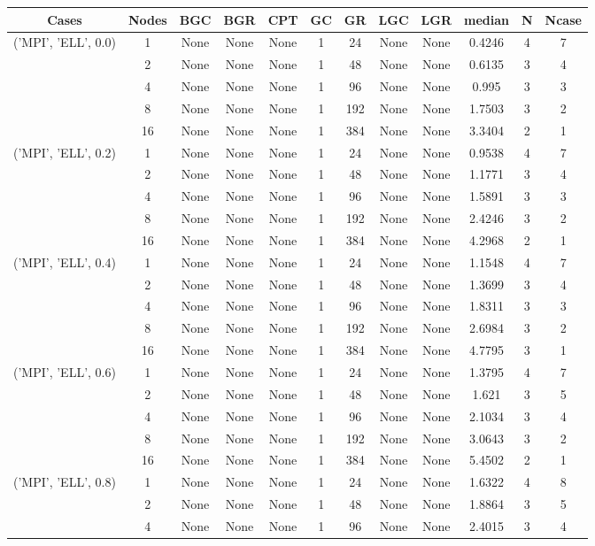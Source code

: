 \begin{tabular}{cccccccccccc}
\hline
Cases & Nodes& BGC& BGR& CPT& GC& GR& LGC& LGR& median & N & Ncase \\
\hline
\multirow{5}{*}{('MPI', 'ELL', 0.0)}& 1& None& None& None& 1& 24& None& None& 0.4246& 4& 7\\
& 2& None& None& None& 1& 48& None& None& 0.6135& 3& 4\\
& 4& None& None& None& 1& 96& None& None& 0.995& 3& 3\\
& 8& None& None& None& 1& 192& None& None& 1.7503& 3& 2\\
& 16& None& None& None& 1& 384& None& None& 3.3404& 2& 1\\
\hline
\multirow{5}{*}{('MPI', 'ELL', 0.2)}& 1& None& None& None& 1& 24& None& None& 0.9538& 4& 7\\
& 2& None& None& None& 1& 48& None& None& 1.1771& 3& 4\\
& 4& None& None& None& 1& 96& None& None& 1.5891& 3& 3\\
& 8& None& None& None& 1& 192& None& None& 2.4246& 3& 2\\
& 16& None& None& None& 1& 384& None& None& 4.2968& 2& 1\\
\hline
\multirow{5}{*}{('MPI', 'ELL', 0.4)}& 1& None& None& None& 1& 24& None& None& 1.1548& 4& 7\\
& 2& None& None& None& 1& 48& None& None& 1.3699& 3& 4\\
& 4& None& None& None& 1& 96& None& None& 1.8311& 3& 3\\
& 8& None& None& None& 1& 192& None& None& 2.6984& 3& 2\\
& 16& None& None& None& 1& 384& None& None& 4.7795& 3& 1\\
\hline
\multirow{5}{*}{('MPI', 'ELL', 0.6)}& 1& None& None& None& 1& 24& None& None& 1.3795& 4& 7\\
& 2& None& None& None& 1& 48& None& None& 1.621& 3& 5\\
& 4& None& None& None& 1& 96& None& None& 2.1034& 3& 4\\
& 8& None& None& None& 1& 192& None& None& 3.0643& 3& 2\\
& 16& None& None& None& 1& 384& None& None& 5.4502& 2& 1\\
\hline
\multirow{5}{*}{('MPI', 'ELL', 0.8)}& 1& None& None& None& 1& 24& None& None& 1.6322& 4& 8\\
& 2& None& None& None& 1& 48& None& None& 1.8864& 3& 5\\
& 4& None& None& None& 1& 96& None& None& 2.4015& 3& 4\\

\end{tabular}
